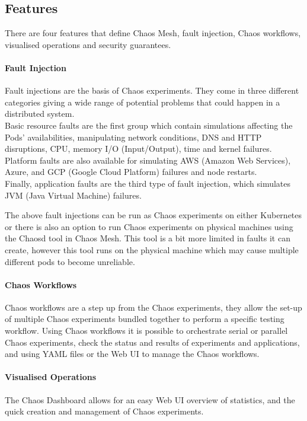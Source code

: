 \documentclass[conference]{IEEEtran}
\begin{document}
\subsection{Features}

There are four features that define Chaos Mesh, fault injection, Chaos workflows, visualised operations and security guarantees.

\paragraph{Fault Injection}
Fault injections are the basis of Chaos experiments. They come in three different categories giving a wide range of potential problems that could happen in a distributed system.\\
Basic resource faults are the first group which contain simulations affecting the Pods' availabilities, manipulating network conditions, DNS and HTTP disruptions, CPU, memory I/O (Input/Output), time and kernel failures.\\
Platform faults are also available for simulating AWS (Amazon Web Services), Azure, and GCP (Google Cloud Platform) failures and node restarts.\\
Finally, application faults are the third type of fault injection, which simulates JVM (Java Virtual Machine) failures.

The above fault injections can be run as Chaos experiments on either Kubernetes or there is also an option to run Chaos experiments on physical machines using the Chaosd tool in Chaos Mesh. This tool is a bit more limited in faults it can create, however this tool runs on the physical machine which may cause multiple different pods to become unreliable.

\paragraph{Chaos Workflows}
Chaos workflows are a step up from the Chaos experiments, they allow the set-up of multiple Chaos experiments bundled together to perform a specific testing workflow. Using Chaos workflows it is possible to orchestrate serial or parallel Chaos experiments, check the status and results of experiments and applications, and using YAML files or the Web UI to manage the Chaos workflows.

\paragraph{Visualised Operations}
The Chaos Dashboard allows for an easy Web UI overview of statistics, and the quick creation and management of Chaos experiments.
\end{document}
